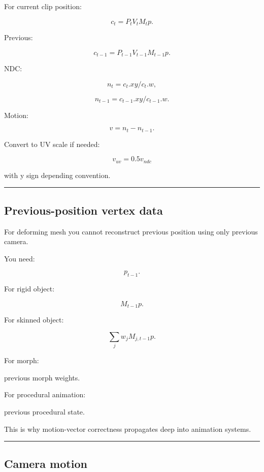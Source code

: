 For current clip position:

\[
c_t=
P_tV_tM_tp.
\]

Previous:

\[
c_{t-1}
=
P_{t-1}
V_{t-1}
M_{t-1}
p.
\]

NDC:

\[
n_t=
c_t.xy/c_t.w,
\]

\[
n_{t-1}
=
c_{t-1}.xy/c_{t-1}.w.
\]

Motion:

\[
\boxed{
v=
n_t-n_{t-1}.
}
\]

Convert to UV scale if needed:

\[
v_{uv}=0.5v_{ndc}
\]

with y sign depending convention.

\begin{center}\rule{0.5\linewidth}{0.5pt}\end{center}

\subsection{Previous-position vertex data}\label{04-visual-computing-ii-ch040-previous-position-vertex-data}

\hypertarget{04-visual-computing-ii-ch040-previous-position-vertex-data}{}

For deforming mesh you cannot reconstruct previous position using only previous camera.

You need:

\[
p_{t-1}.
\]

For rigid object:

\[
M_{t-1}p.
\]

For skinned object:

\[
\sum_j
w_j
M_{j,t-1}p.
\]

For morph:

previous morph weights.

For procedural animation:

previous procedural state.

This is why motion-vector correctness propagates deep into animation systems.

\begin{center}\rule{0.5\linewidth}{0.5pt}\end{center}

\subsection{Camera motion}\label{04-visual-computing-ii-ch040-camera-motion}

